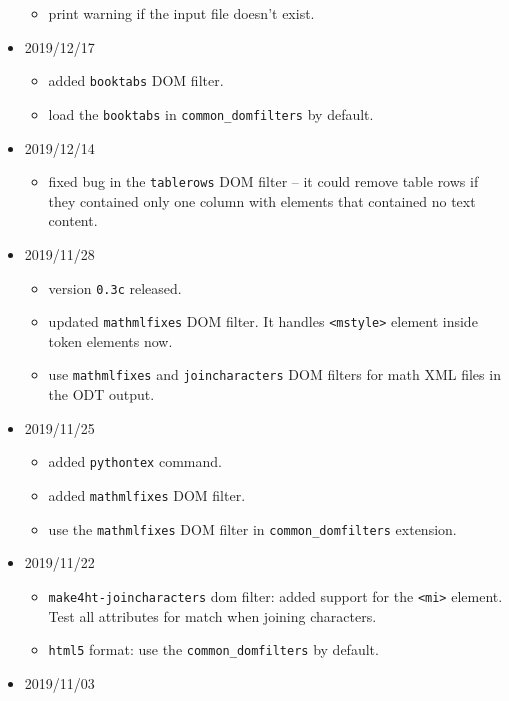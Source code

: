 \begin{itemize}
  \begin{itemize}
  \tightlist
  \item
    print warning if the input file doesn't exist.
  \end{itemize}
\item
  2019/12/17

  \begin{itemize}
  \tightlist
  \item
    added \texttt{booktabs} DOM filter.
  \item
    load the \texttt{booktabs} in \texttt{common\_domfilters} by
    default.
  \end{itemize}
\item
  2019/12/14

  \begin{itemize}
  \tightlist
  \item
    fixed bug in the \texttt{tablerows} DOM filter -- it could remove
    table rows if they contained only one column with elements that
    contained no text content.
  \end{itemize}
\item
  2019/11/28

  \begin{itemize}
  \tightlist
  \item
    version \texttt{0.3c} released.
  \item
    updated \texttt{mathmlfixes} DOM filter. It handles
    \texttt{\textless{}mstyle\textgreater{}} element inside token
    elements now.
  \item
    use \texttt{mathmlfixes} and \texttt{joincharacters} DOM filters for
    math XML files in the ODT output.
  \end{itemize}
\item
  2019/11/25

  \begin{itemize}
  \tightlist
  \item
    added \texttt{pythontex} command.
  \item
    added \texttt{mathmlfixes} DOM filter.
  \item
    use the \texttt{mathmlfixes} DOM filter in
    \texttt{common\_domfilters} extension.
  \end{itemize}
\item
  2019/11/22

  \begin{itemize}
  \tightlist
  \item
    \texttt{make4ht-joincharacters} dom filter: added support for the
    \texttt{\textless{}mi\textgreater{}} element. Test all attributes
    for match when joining characters.
  \item
    \texttt{html5} format: use the \texttt{common\_domfilters} by
    default.
  \end{itemize}
\item
  2019/11/03


\end{itemize}
